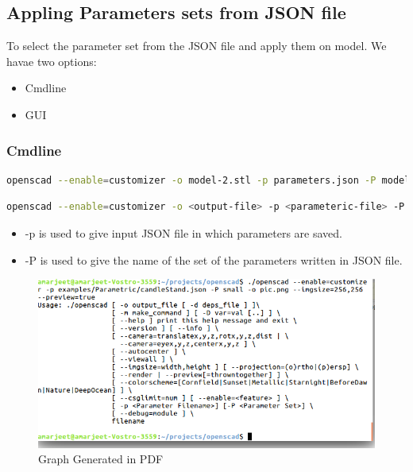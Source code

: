 \subsection{Appling Parameters sets from JSON file}
To select the parameter set from the JSON file and apply them on model. We havae two options:

\begin{itemize}
	\item Cmdline
	\item GUI
\end{itemize}

\subsubsection{Cmdline}
\begin{lstlisting}[language=bash]
openscad --enable=customizer -o model-2.stl -p parameters.json -P model-2 model.scad
\end{lstlisting}

\begin{lstlisting}[language=bash]
openscad --enable=customizer -o <output-file> -p <parameteric-file> -P <NameOfSet> <input-file SCAD file >\end{lstlisting}

\begin{itemize}
	\item -p is used to give input JSON file in which parameters are saved.
	\item -P is used to give the name of the set of the parameters written in JSON file.
\end{itemize}

\begin{figure}[H] 
	\centering \includegraphics[scale=0.5]{images/output/8.png}
	\caption{Graph Generated in PDF}
	\label{fig:7}
\end{figure}

